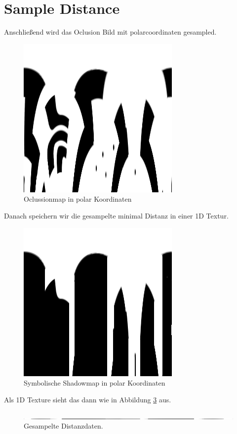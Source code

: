 \section{Sample Distance}
Anschließend wird das Oclusion Bild mit polarcoordinaten gesampled.
\begin{figure}
	\centering
	\includegraphics{images/oclusion_polar_2.png}
	\caption{Oclussionmap in polar Koordinaten}
	\label{o_2}
\end{figure}
Danach speichern wir die gesampelte minimal Distanz in einer 1D Textur.
\begin{figure}
	\centering
	\includegraphics{images/shadow_polar_2.png}
	\caption{Symbolische Shadowmap in polar Koordinaten}
	\label{o_3}
\end{figure}
Als 1D Texture sieht das dann wie in Abbildung \ref{o_4} aus.
\begin{figure}
	\centering
	\includegraphics{images/1DTexture.png}
	\caption{Gesampelte Distanzdaten.}
	\label{o_4}
\end{figure}